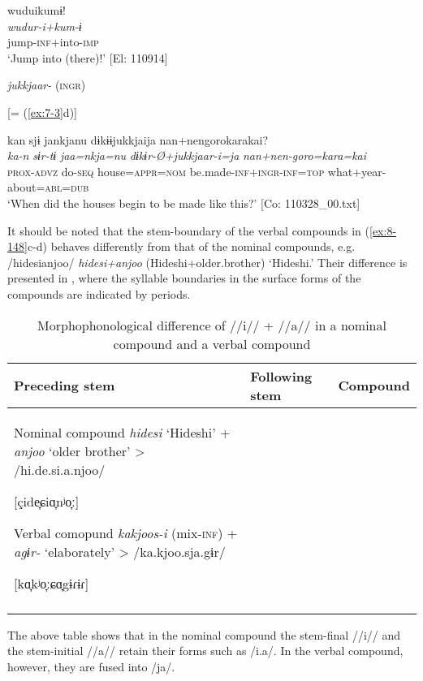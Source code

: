 \ex
{\TM}
\glll  wuduikumɨ!\\
\textit{wudur-i+kum-ɨ}\\
jump-\textsc{inf}+into-\textsc{imp}\\
\glt ‘Jump into (there)!’ [El: 110914]

\textit{jukkjaar-} (\textsc{ingr})

\ex{}  [= (\ref{ex:7-3}d)]

{\TM}
\glll  kan  sjɨ  jankjanu  dɨkɨɨjukkjaija  {\textbar}nan+nengoro{\textbar}karakai?\\
\textit{ka-n}  \textit{sɨr-tɨ}  \textit{jaa=nkja=nu}  \textit{dɨkɨr-Ø+jukkjaar-i=ja}    \textit{nan+nen-goro=kara=kai}\\
\textsc{prox}-\textsc{advz}  do-\textsc{seq}  house=\textsc{appr}=\textsc{nom}  be.made-\textsc{inf}+\textsc{ingr}-\textsc{inf}=\textsc{top}   what+year-about=\textsc{abl}=\textsc{dub}\\
\glt ‘When did the houses begin to be made like this?’ [Co: 110328\_00.txt]
\z
\z

It should be noted that the stem-boundary of the verbal compounds in (\ref{ex:8-148}c-d) behaves differently from that of the nominal compounds, e.g. /hidesianjoo/ \textit{hidesi+anjoo} (Hideshi+older.brother) ‘Hideshi.’ Their difference is presented in , where the syllable boundaries in the surface forms of the compounds are indicated by periods.

\begin{table}
\caption{\label{tab:key:88}Morphophonological difference of //i// + //a// in a nominal compound and a verbal compound}
\begin{tabular}{lll}
  \lsptoprule
Preceding stem  &  Following stem    & Compound\\
\midrule
Nominal compound  \textit{hidesi}  ‘Hideshi’  +  \textit{anjoo}  ‘older brother’  >  /hi.de.si.a.njoo/

[çide̞ɕiɑ̞nʲo̞ː]

Verbal comopund  \textit{kakjoos-i}  (mix-\textsc{inf})  +  \textit{agɨr-}  ‘elaborately’  >  /ka.kjoo.sja.gɨr/

[kɑ̞kʲo̞ːɕɑ̞gɨɾɨɾ]\\
\lspbottomrule
\end{tabular}
\end{table}


The above table shows that in the nominal compound the stem-final //i// and the stem-initial //a// retain their forms such as /i.a/. In the verbal compound, however, they are fused into /ja/.

